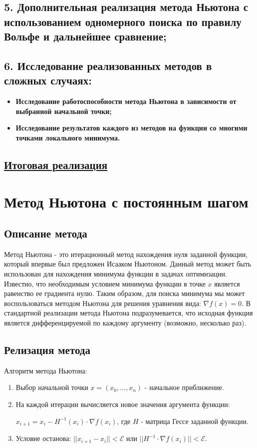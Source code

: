 \documentclass{article}
\begin{document}
\subsection*{5. Дополнительная реализация метода Ньютона с использованием одномерного поиска по правилу Вольфе и дальнейшее сравнение;}
\subsection*{6. Исследование реализованных методов в сложных случаях:}
\begin{itemize}
    \item \textbf{Исследование работоспособности метода Ньютона в зависимости от выбранной начальной точки;}
    \item \textbf{Исследование результатов каждого из методов на функции со многими точками локального минимума.}
\end{itemize}
\subsection*{\href{https://gitfront.io/r/Vitaliy-X-0/TLNs9s2iAaGd/MetOpt/}{Итоговая реализация}}

\newpage
\section*{Метод Ньютона с постоянным шагом}
\subsection*{Описание метода}
Метод Ньютона - это итерационный метод нахождения нуля заданной функции, который впервые был предложен Исааком Ньютоном. Данный метод может быть использован для нахождения минимума функции в задачах оптимизации. Известно, что необходимым условием минимума функции в точке $x$ является равенство ее градиента нулю. Таким образом, для поиска минимума мы может воспользоваться методом Ньютона для решения уравнения вида: $\nabla f(x) = 0$. В стандартной реализации метода Ньютона подразумевается, что исходная функция является дифференцируемой по каждому аргументу (возможно, несколько раз).
\subsection*{Релизация метода}
Алгоритм метода Ньютона:
\begin{enumerate}
    \item Выбор начальной точки $x = (x_0, \dots, x_n)$ - начальное приближение.
    \item На каждой итерации вычисляется новое значения аргумента функции:
    
    $x_{i+1} = x_i - H^{-1}(x_i) \cdot \nabla f(x_i)$, где $H$ - матрица Гессе заданной функции.
    \item Условие останова: $||x_{i+1} - x_{i}|| < \mathcal{E}$ \; или \; $||H^{-1} \cdot \nabla f(x_{i})|| < \mathcal{E}$.
\end{enumerate}
\end{document}
